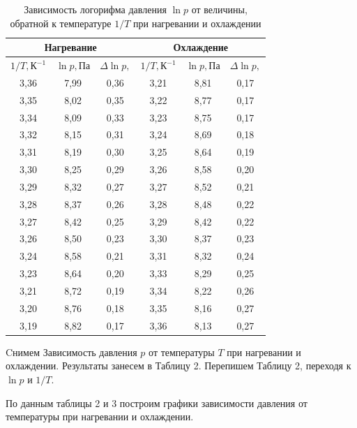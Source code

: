 \documentclass[a4paper,12pt]{article}
\theoremstyle{plain} %
\theoremstyle{definition} %
\theoremstyle{remark} %
\begin{document}
\begin{table}[H]
	\begin{center}
	\begin{tabular}{|c|c|c||c|c|c|}
		\hline
		\multicolumn{3}{|c||}{Нагревание}  & \multicolumn{3}{|c|}{Охлаждение}     \\ \hline
		\rule{0cm}{2.5ex}
		$1/T, \text{К}^{-1}$      & $\ln p, \text{Па}$      & $\Delta \ln p,$      & $1/T, \text{К}^{-1}$      & $\ln p, \text{Па}$      & $\Delta \ln p,$     \\\hline
		3,36 & 7,99 & 0,36 & 3,21 & 8,81 & 0,17 \\ \hline
		3,35 & 8,02 & 0,35 & 3,22 & 8,77 & 0,17 \\ \hline
		3,34 & 8,09 & 0,33 & 3,23 & 8,75 & 0,17 \\ \hline
		3,32 & 8,15 & 0,31 & 3,24 & 8,69 & 0,18 \\ \hline
		3,31 & 8,19 & 0,30 & 3,25 & 8,64 & 0,19 \\ \hline
		3,30 & 8,25 & 0,29 & 3,26 & 8,58 & 0,20 \\ \hline
		3,29 & 8,32 & 0,27 & 3,27 & 8,52 & 0,21 \\ \hline
		3,28 & 8,37 & 0,26 & 3,28 & 8,48 & 0,22 \\ \hline
		3,27 & 8,42 & 0,25 & 3,29 & 8,42 & 0,22 \\ \hline
		3,26 & 8,50 & 0,23 & 3,30 & 8,37 & 0,23 \\ \hline
		3,24 & 8,58 & 0,21 & 3,31 & 8,32& 0,24 \\ \hline
		3,23 & 8,64 & 0,20 & 3,33 & 8,29 & 0,25 \\ \hline
		3,21 & 8,72 & 0,19 & 3,34 & 8,22 & 0,26 \\ \hline
		3,20 & 8,76 & 0,18 & 3,35 & 8,16 & 0,27 \\ \hline
		3,19 & 8,82 & 0,17 & 3,36 & 8,13 & 0,27 \\ \hline
	\end{tabular}
\captionsetup{justification=centering}
\caption{Зависимость логорифма давления $\ln p$ от величины, обратной к температуре $1/T$ при нагревании и охлаждении}
\end{center}
\end{table}
Cнимем Зависимость давления $p$ от температуры $T$ при нагревании и охлаждении. Результаты занесем в Таблицу 2. Перепишем Таблицу 2, переходя к $\ln p$ и $1/T$.

По данным таблицы 2 и 3 построим графики зависимости давления от температуры при нагревании и охлаждении.
\end{document}
